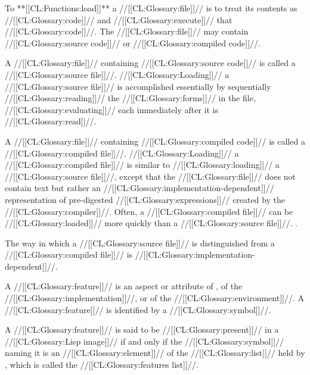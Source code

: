 



To **[[CL:Functions:load]]** a //[[CL:Glossary:file]]// is to treat its contents as //[[CL:Glossary:code]]//
and //[[CL:Glossary:execute]]// that //[[CL:Glossary:code]]//.
The //[[CL:Glossary:file]]// may contain //[[CL:Glossary:source code]]// or //[[CL:Glossary:compiled code]]//.

A //[[CL:Glossary:file]]// containing //[[CL:Glossary:source code]]// is called a //[[CL:Glossary:source file]]//.
//[[CL:Glossary:Loading]]// a //[[CL:Glossary:source file]]// is accomplished essentially 
by sequentially //[[CL:Glossary:reading]]// the //[[CL:Glossary:forms]]// in the file,
//[[CL:Glossary:evaluating]]// each immediately after it is //[[CL:Glossary:read]]//.


A //[[CL:Glossary:file]]// containing //[[CL:Glossary:compiled code]]// is called a //[[CL:Glossary:compiled file]]//.
//[[CL:Glossary:Loading]]// a //[[CL:Glossary:compiled file]]// is similar to //[[CL:Glossary:loading]]// a //[[CL:Glossary:source file]]//,
except that the //[[CL:Glossary:file]]// does not contain text but rather an
//[[CL:Glossary:implementation-dependent]]// representation of pre-digested //[[CL:Glossary:expressions]]//
created by the //[[CL:Glossary:compiler]]//.  Often, a //[[CL:Glossary:compiled file]]// can be //[[CL:Glossary:loaded]]//
more quickly than a //[[CL:Glossary:source file]]//.
\Seesection\Compilation.

The way in which a //[[CL:Glossary:source file]]// is distinguished from a //[[CL:Glossary:compiled file]]// 
is //[[CL:Glossary:implementation-dependent]]//.

\endsubsection%


A //[[CL:Glossary:feature]]// is an aspect or attribute
     of \clisp, 
     of the //[[CL:Glossary:implementation]]//,
  or of the //[[CL:Glossary:environment]]//.
A //[[CL:Glossary:feature]]// is identified by a //[[CL:Glossary:symbol]]//.

A //[[CL:Glossary:feature]]// is said to be //[[CL:Glossary:present]]// in a //[[CL:Glossary:Lisp image]]//
if and only if the //[[CL:Glossary:symbol]]// naming it is an //[[CL:Glossary:element]]// of the
//[[CL:Glossary:list]]// held by , 
which is called the //[[CL:Glossary:features list]]//.


